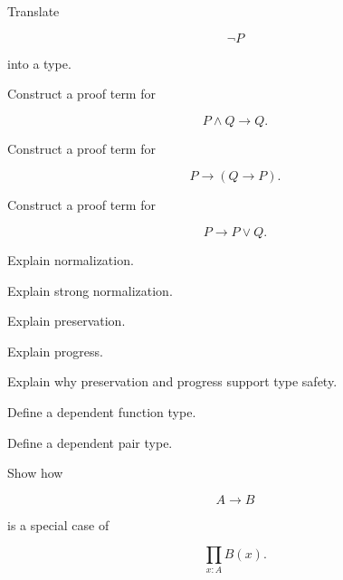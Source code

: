\begin{exercise}[2]
Translate

\[
\neg P
\]

into a type.
\end{exercise}

\begin{exercise}[3]
Construct a proof term for

\[
P\land Q\rightarrow Q.
\]
\end{exercise}

\begin{exercise}[3]
Construct a proof term for

\[
P\rightarrow(Q\rightarrow P).
\]
\end{exercise}

\begin{exercise}[3]
Construct a proof term for

\[
P\rightarrow P\lor Q.
\]
\end{exercise}

\begin{exercise}[3]
Explain normalization.
\end{exercise}

\begin{exercise}[3]
Explain strong normalization.
\end{exercise}

\begin{exercise}[3]
Explain preservation.
\end{exercise}

\begin{exercise}[3]
Explain progress.
\end{exercise}

\begin{exercise}[3]
Explain why preservation and progress support type safety.
\end{exercise}

\begin{exercise}[2]
Define a dependent function type.
\end{exercise}

\begin{exercise}[2]
Define a dependent pair type.
\end{exercise}

\begin{exercise}[3]
Show how

\[
A\to B
\]

is a special case of

\[
\prod_{x:A}B(x).
\]
\end{exercise}

